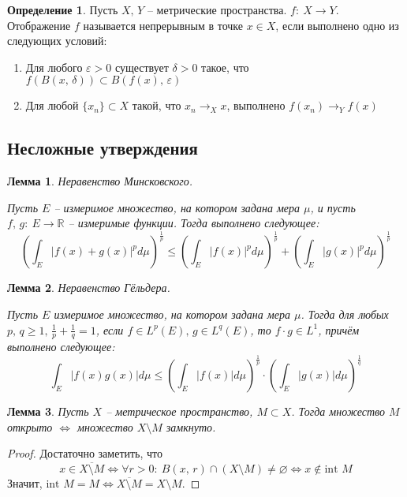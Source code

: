 \documentclass[a4paper,12pt]{article}
\renewcommand{\leq}{\ensuremath{\leqslant}}
\renewcommand{\geq}{\ensuremath{\geqslant}}
\renewcommand{\emptyset}{\ensuremath{\varnothing}}
\theoremstyle{plain}
\newtheorem{lemma}{Лемма}[section]
\theoremstyle{definition}
\newtheorem{definition}{Определение}[section]
\theoremstyle{remark}
\begin{document}
\begin{definition}
	Пусть $X,\, Y$ -- метрические пространства. $f :\: X \to Y$. Отображение $f$ называется непрерывным в точке $x \in X$, если выполнено одно из следующих условий:
	\begin{enumerate}
		\item Для любого $\varepsilon > 0$ существует $\delta > 0$ такое, что $f(B(x,\, \delta)) \subset B(f(x),\, \varepsilon)$
		\item Для любой $\{x_n\} \subset X$ такой, что $x_n \to_X x$, выполнено $f(x_n) \to_Y f(x)$
	\end{enumerate}
\end{definition}

\subsection{Несложные утверждения}

\begin{lemma}
	Неравенство Минсковского.

	Пусть $E$ -- измеримое множество, на котором задана мера $\mu$, и пусть $f,\,g :\: E \to \mathbb{R}$ -- измеримые функции. Тогда выполнено следующее:
	\[
		\left(\int_E \vert f(x) + g(x)\vert^pd\mu\right)^{\frac{1}{p}} \leq \left(\int_E \vert f(x)\vert^p d\mu\right)^{\frac{1}{p}} + \left(\int_E \vert g(x)\vert^pd\mu\right)^{\frac{1}{p}}
	\]
\end{lemma}

\begin{lemma}
	Неравенство Гёльдера.

	Пусть $E$ измеримое множество, на котором задана мера $\mu$. Тогда для любых $p,\,q \geq 1,\, \frac{1}{p} + \frac{1}{q} = 1$, если $f \in L^p(E),\, g \in L^q(E)$, то $f \cdot g \in L^1$, причём выполнено следующее:
	\[
		\int_E \vert f(x)g(x) \vert d\mu \leq \left(\int_E \vert f(x)\vert d\mu\right)^{\frac{1}{p}} \cdot \left(\int_E \vert g(x) \vert d\mu\right)^{\frac{1}{q}}
	\]
\end{lemma}

\begin{lemma}
	Пусть $X$ -- метрическое пространство, $M \subset X$. Тогда множество $M$ открыто $\Leftrightarrow$ множество $X \setminus M$ замкнуто.
\end{lemma}

\begin{proof}
	Достаточно заметить, что
	\[
		x \in \overline{X \setminus M} \Leftrightarrow \forall r > 0 :\: B(x,\, r) \cap (X \setminus M) \neq \emptyset \Leftrightarrow x \not\in \text{int }M
	\]
	Значит, $\text{int }M = M \Leftrightarrow \overline{X \setminus M} = X \setminus M$.
\end{proof}
\end{document}
